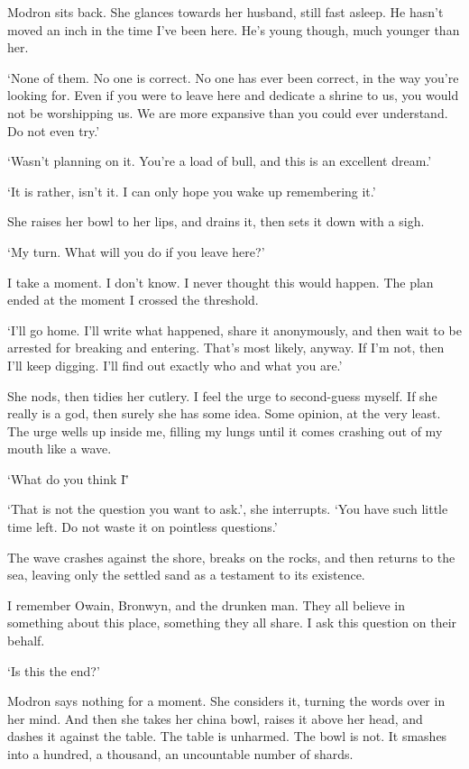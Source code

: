 Modron sits back. She glances towards her husband, still fast
asleep. He hasn’t moved an inch in the time I’ve been here. He’s young
though, much younger than her.

`None of them. No one is correct. No one has ever been correct, in the
way you’re looking for. Even if you were to leave here and dedicate a
shrine to us, you would not be worshipping us. We are more expansive
than you could ever understand. Do not even try.'

`Wasn’t planning on it. You’re a load of bull, and this is an
excellent dream.'

`It is rather, isn’t it. I can only hope you wake up remembering it.'

She raises her bowl to her lips, and drains it, then sets it down with
a sigh.

`My turn. What will you do if you leave here?'

I take a moment. I don’t know. I never thought this would happen. The
plan ended at the moment I crossed the threshold.

`I’ll go home. I’ll write what happened, share it anonymously, and
then wait to be arrested for breaking and entering. That’s most
likely, anyway. If I’m not, then I’ll keep digging. I’ll find out
exactly who and what you are.'

She nods, then tidies her cutlery. I feel the urge to second-guess
myself. If she really is a god, then surely she has some idea. Some
opinion, at the very least. The urge wells up inside me, filling my
lungs until it comes crashing out of my mouth like a wave.

`What do you think I\='

`That is not the question you want to ask.', she interrupts. `You have
such little time left. Do not waste it on pointless questions.'

The wave crashes against the shore, breaks on the rocks, and then
returns to the sea, leaving only the settled sand as a testament to
its existence.

I remember Owain, Bronwyn, and the drunken man. They all believe in
something about this place, something they all share. I ask this
question on their behalf.

`Is this the end?'

Modron says nothing for a moment. She considers it, turning the words
over in her mind. And then she takes her china bowl, raises it above
her head, and dashes it against the table. The table is unharmed. The
bowl is not. It smashes into a hundred, a thousand, an uncountable
number of shards.

